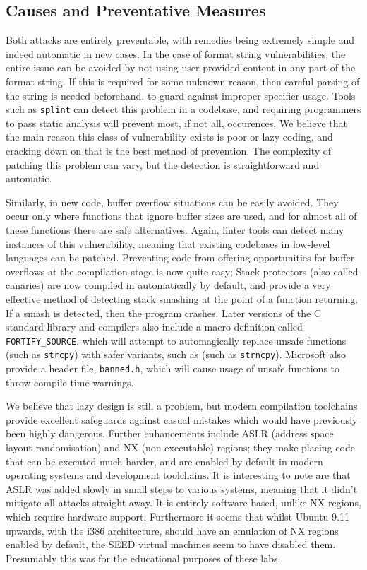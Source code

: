 \subsection{Causes and Preventative Measures}
Both attacks are entirely preventable, with remedies being extremely simple and indeed automatic in new cases.
In the case of format string vulnerabilities, the entire issue can be avoided by not using user-provided content in
any part of the format string. If this is required for some unknown reason, then careful parsing of the string
is needed beforehand, to guard against improper specifier usage. Tools such as {\tt splint} can detect
this problem in a codebase\cite{splint_art}, and requiring programmers to pass static analysis will prevent most,
if not all, occurences. We believe that the main reason this class of vulnerability exists is poor or lazy
coding, and cracking down on that is the best method of prevention. The complexity of patching this problem can vary,
but the detection is straightforward and automatic.

Similarly, in new code, buffer overflow situations can be easily avoided. They occur only where functions that ignore
buffer sizes are used, and for almost all of these functions there are safe alternatives. Again, linter tools can
detect many instances of this vulnerability, meaning that existing codebases in low-level languages can be patched.
Preventing code from offering opportunities for buffer overflows at the compilation stage is now quite easy;
Stack protectors (also called canaries) are now compiled in automatically by default, and provide a very effective
method of detecting stack smashing at the point of a function returning. If a smash is detected, then the program crashes.
Later versions of the C standard library and compilers also include a macro definition called {\tt FORTIFY\_SOURCE},
which will attempt to automagically replace unsafe functions (such as {\tt strcpy}) with safer variants, such as
(such as {\tt strncpy})\cite{fort_source}. Microsoft also provide a header file, {\tt banned.h}, which will cause
usage of unsafe functions to throw compile time warnings\cite{banned}.

We believe that lazy design is still a problem, but modern compilation toolchains provide excellent safeguards against
casual mistakes which would have previously been highly dangerous. Further enhancements include ASLR (address space
layout randomisation) and NX (non-executable) regions; they make placing code that can be executed much harder,
and are enabled by default in modern operating systems and development toolchains\cite{wiki_aslr}\cite{wiki_nx}.
It is interesting to note are that ASLR was added slowly in small steps to various systems, meaning that it didn't
mitigate all attacks straight away. It is entirely software based, unlike NX regions, which require hardware support.
Furthermore it seems that whilst Ubuntu 9.11 upwards, with the i386 architecture, should have an emulation of NX regions
enabled by default\cite{nx_bit}, the SEED virtual machines seem to have disabled them.
Presumably this was for the educational purposes of these labs.

